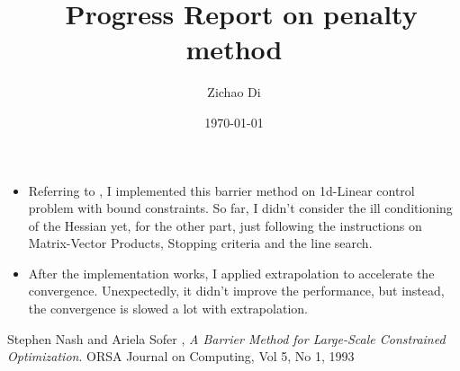 \documentclass[10pt]{article}
\title{\ Progress Report on penalty method}
\author{Zichao Di}
\date{\today}
\begin{document}
  \maketitle 

\begin{itemize}
\item Referring to \cite{NA}, I implemented this barrier method on 1d-Linear control problem with bound constraints. So far, I didn't consider the ill conditioning of the Hessian yet, for the other part, just following the instructions on Matrix-Vector Products, Stopping criteria and the line search.
\item After the implementation works, I applied extrapolation to accelerate the convergence. Unexpectedly, it didn't improve the performance, but instead, the convergence is slowed a lot with extrapolation. 

\end{itemize}


\begin{thebibliography}{9}

  Stephen Nash and Ariela Sofer , 
  \emph{A Barrier Method for Large-Scale Constrained Optimization}.
ORSA Journal on Computing,
Vol 5,
No 1,
1993
\end{thebibliography}
\end{document}

